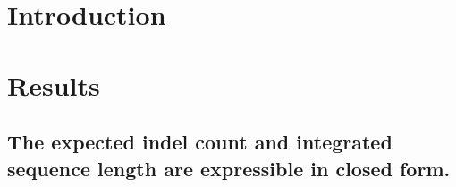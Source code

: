\section{Introduction}






\section{Results}


\subsection{The expected indel count and integrated sequence length are expressible in closed form.}

